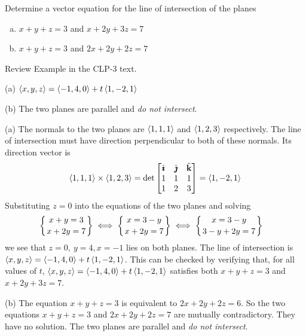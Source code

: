 \begin{question}
Determine a vector equation for the line of intersection
of the planes
\begin{enumerate}[(a)]
\item $x+y+z=3$ and $x+2y+3z=7$
\item $x+y+z=3$ and $2x+2y+2z=7$
\end{enumerate}
\end{question}

\begin{hint}
Review Example  in the CLP-3 text.
\end{hint}

\begin{answer}
(a) $\left< x,y,z\right>=\left< -1,4,0\right>+t\left< 1,-2,1\right> $

(b) The two planes are parallel and \emph{do not intersect}.

\end{answer}

\begin{solution}
(a) The normals to the two planes are $\left< 1,1,1\right> $ and $\left< 1,2,3\right> $
respectively. The line of intersection must have direction perpendicular
to both of these normals. Its direction vector is 
\begin{equation*}
\left< 1,1,1\right> \times\left< 1,2,3\right> 
=\det\left[\begin{matrix} \hat{\pmb{\imath}} &\hat{\pmb{\jmath}} &\hat{\mathbf{k}} \\ 1&1&1 \\ 1&2&3 \end{matrix}\right]
=\left< 1,-2,1\right> 
\end{equation*}
Substituting $z=0$ into the equations of the two planes and solving
\begin{align*}
\left\{\Atop{x+y=3}{x+2y=7} \right\}
&\iff \left\{\Atop{x=3-y}{x+2y=7} \right\}
\iff\left\{\Atop{x=3-y}{3-y+2y=7} \right\}
\end{align*}
we see that $z=0,\ y=4, x=-1$ lies on both planes. The line of
intersection is $\left< x,y,z\right>=\left< -1,4,0\right>+t\left< 1,-2,1\right> $. 
This can be checked by verifying that,  for all values of $t$, 
$\left< x,y,z\right>=\left< -1,4,0\right>+t\left< 1,-2,1\right> $ satisfies both 
$x+y+z=3$ and $x+2y+3z=7$.

(b) The equation $x+y+z=3$ is equivalent to $2x+2y+2z=6$.
So the two equations $x+y+z=3$ and $2x+2y+2z=7$ are mutually
contradictory. They have no solution. The two planes are parallel and
\emph{do not intersect}.
\end{solution}

